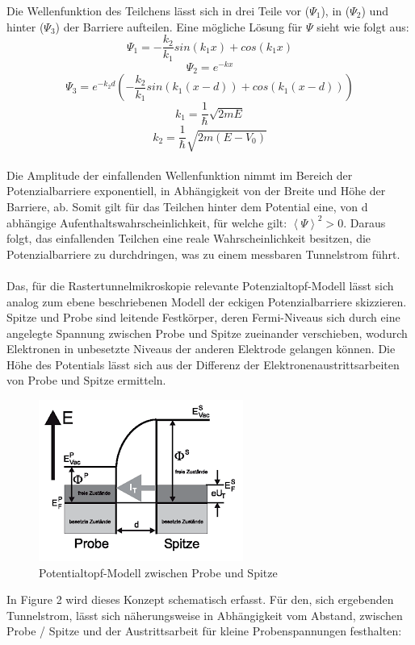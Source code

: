 \documentclass[10pt,a4paper]{article}
\begin{document}
Die Wellenfunktion des Teilchens lässt sich in drei Teile vor ($\Psi_{1}$), in ($\Psi_{2}$) und hinter ($\Psi_{3}$) der Barriere aufteilen. Eine mögliche Lösung für $\Psi$ sieht wie folgt aus:\\
$$\Psi_{1}= -\frac{k_{2}}{k_{1}}sin(k_{1}x) + cos(k_{1}x)$$ 
$$\Psi_{2}= e^{-kx}$$
$$\Psi_{3}= e^{-k_{2}d}(-\frac{k_{2}}{k_{1}}sin(k_{1}(x-d)) + cos(k_{1}(x-d)))$$
$$ k_{1} = \frac{1}{\hbar}\sqrt{2mE} $$
$$k_{2} = \frac{1}{\hbar}\sqrt{2m(E-V_{0})}$$
\\Die Amplitude der einfallenden Wellenfunktion nimmt im Bereich der Potenzialbarriere exponentiell, in Abhängigkeit von der Breite und Höhe der Barriere, ab. Somit gilt für das Teilchen hinter dem Potential eine, von d abhängige Aufenthaltswahrscheinlichkeit, für welche gilt: $\left \langle \Psi  \right \rangle^{2} > 0$. Daraus folgt, das einfallenden Teilchen eine reale Wahrscheinlichkeit besitzen, die Potenzialbarriere zu durchdringen, was zu einem messbaren Tunnelstrom führt. \\ \\Das, für die Rastertunnelmikroskopie relevante Potenzialtopf-Modell lässt sich analog zum ebene beschriebenen Modell der eckigen Potenzialbarriere skizzieren. Spitze und Probe sind leitende Festkörper, deren Fermi-Niveaus sich durch eine angelegte Spannung zwischen Probe und Spitze zueinander verschieben, wodurch Elektronen in unbesetzte Niveaus der anderen Elektrode gelangen können. Die Höhe des Potentials lässt sich aus der Differenz der Elektronenaustrittsarbeiten von Probe und Spitze ermitteln.
\begin{figure}[h]
	\includegraphics[scale = 1.2]{potentialtopf.png}
	\centering
	\caption{Potentialtopf-Modell zwischen Probe und Spitze}
	\label{diagramm_aufspaltung}
\end{figure} 
In Figure 2 wird dieses Konzept schematisch erfasst. Für den, sich ergebenden Tunnelstrom, lässt sich näherungsweise in Abhängigkeit vom Abstand, zwischen Probe / Spitze und der Austrittsarbeit für kleine Probenspannungen festhalten: 
\end{document}

